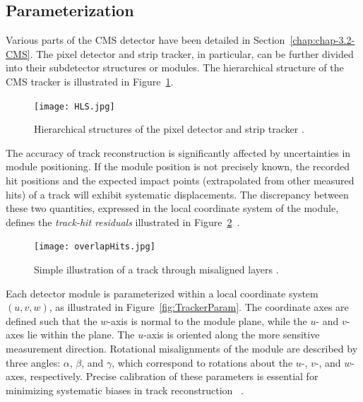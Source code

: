 \subsection{Parameterization}

Various parts of the CMS detector have been detailed in Section~\ref{chap:chap-3.2-CMS}. The pixel detector and strip tracker, in particular, can be further divided into their subdetector structures or modules. The hierarchical structure of the CMS tracker is illustrated in Figure~\ref{fig:HLS}. 

\begin{figure}[!hbt]
    \begin{center}
        \texttt{[image: HLS.jpg]}
        \caption{Hierarchical structures of the pixel detector and strip tracker \cite{WAdam_2009}.}
        \label{fig:HLS}
    \end{center}
\end{figure}

The accuracy of track reconstruction is significantly affected by uncertainties in module positioning. If the module position is not precisely known, the recorded hit positions and the expected impact points (extrapolated from other measured hits) of a track will exhibit systematic displacements. The discrepancy between these two quantities, expressed in the local coordinate system of the module, defines the \emph{track-hit residuals} illustrated in Figure~\ref{fig:overlapHits}~\cite{Karimaki:926537}.  

\begin{figure}[!hbt]
    \begin{center}
        \texttt{[image: overlapHits.jpg]}
        \caption{Simple illustration of a track through misaligned layers \cite{2022166795}.}
        \label{fig:overlapHits}
    \end{center}
\end{figure}

Each detector module is parameterized within a local coordinate system $(u, v, w)$, as illustrated in Figure~\ref{fig:TrackerParam}. The coordinate axes are defined such that the $w$-axis is normal to the module plane, while the $u$- and $v$-axes lie within the plane. The $u$-axis is oriented along the more sensitive measurement direction. Rotational misalignments of the module are described by three angles: $\alpha$, $\beta$, and $\gamma$, which correspond to rotations about the $u$-, $v$-, and $w$-axes, respectively. Precise calibration of these parameters is essential for minimizing systematic biases in track reconstruction ~\cite{Karimaki:926537, Karimaki:2003bd}.

